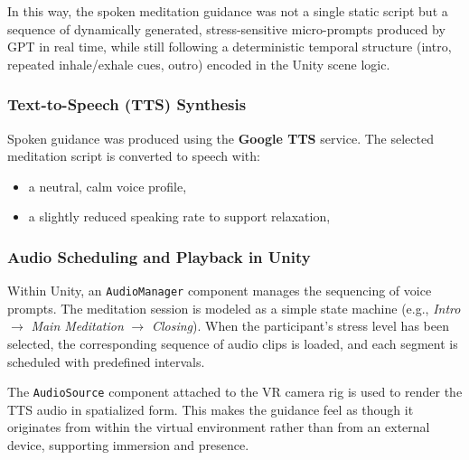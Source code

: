 In this way, the spoken meditation guidance was not a single static script but a sequence of dynamically generated, stress-sensitive micro-prompts produced by GPT in real time, while still following a deterministic temporal structure (intro, repeated inhale/exhale cues, outro) encoded in the Unity scene logic.

\subsubsection{Text-to-Speech (TTS) Synthesis}

Spoken guidance was produced using the \textbf{Google TTS} service. The selected meditation script is converted to speech with:
\begin{itemize}
    \item a neutral, calm voice profile,
    \item a slightly reduced speaking rate to support relaxation,
\end{itemize}


\subsubsection{Audio Scheduling and Playback in Unity}

Within Unity, an \texttt{AudioManager} component manages the sequencing of voice prompts. The meditation session is modeled as a simple state machine (e.g., \emph{Intro} $\rightarrow$ \emph{Main Meditation} $\rightarrow$ \emph{Closing}). When the participant’s stress level has been selected, the corresponding sequence of audio clips is loaded, and each segment is scheduled with predefined intervals.

The \texttt{AudioSource} component attached to the VR camera rig is used to render the TTS audio in spatialized form. This makes the guidance feel as though it originates from within the virtual environment rather than from an external device, supporting immersion and presence.


